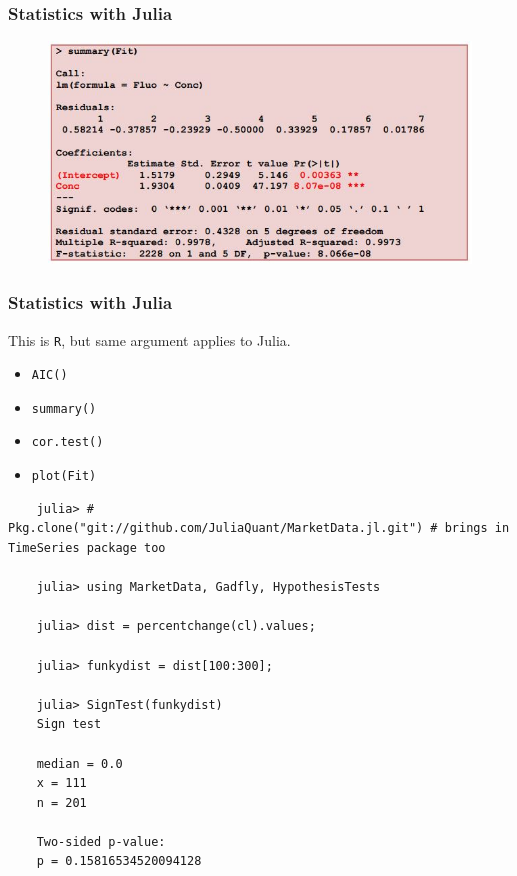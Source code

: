 \documentclass[Master.tex]{subfiles}
\begin{document}
\begin{frame}
	\frametitle{Statistics with Julia}
	\large
\begin{figure}
\centering
\includegraphics[width=1.1\linewidth]{images/LoD}
\caption{}
\label{fig:LoD}
\end{figure}

\end{frame}
\begin{frame}
	\frametitle{Statistics with Julia}
	\large
This is \texttt{R}, but same argument applies to Julia.	
\begin{itemize}
\item \texttt{AIC()}
\item \texttt{summary()}
\item \texttt{cor.test()}
\item \texttt{plot(Fit)}
\end{itemize}
\end{frame}	

\begin{frame}[fragile]
	\begin{verbatim}
	julia> # Pkg.clone("git://github.com/JuliaQuant/MarketData.jl.git") # brings in TimeSeries package too
	
	julia> using MarketData, Gadfly, HypothesisTests
	
	julia> dist = percentchange(cl).values;
	
	julia> funkydist = dist[100:300];
	
	julia> SignTest(funkydist)
	Sign test
	
	median = 0.0
	x = 111
	n = 201
	
	Two-sided p-value:
	p = 0.15816534520094128
	
	\end{verbatim}
	
\end{frame}
\end{document}
